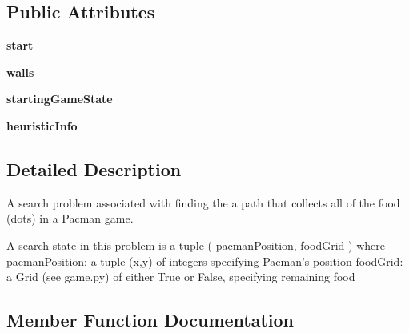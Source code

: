 \subsection*{Public Attributes}
\begin{DoxyCompactItemize}
\item 
\mbox{\label{classsearch_agents_1_1_food_search_problem_a4ef87b14faf538073a2b15cf7c3d425d}} 
{\bfseries start}
\item 
\mbox{\label{classsearch_agents_1_1_food_search_problem_a453ebb7aa98704cf8ccac7dc98157494}} 
{\bfseries walls}
\item 
\mbox{\label{classsearch_agents_1_1_food_search_problem_a53eb097b181626e977c8fe5a337c1a1a}} 
{\bfseries starting\+Game\+State}
\item 
\mbox{\label{classsearch_agents_1_1_food_search_problem_a5ed921e24b8daf256d6738415f1e22c1}} 
{\bfseries heuristic\+Info}
\end{DoxyCompactItemize}


\subsection{Detailed Description}
\begin{DoxyVerb}A search problem associated with finding the a path that collects all of the
food (dots) in a Pacman game.

A search state in this problem is a tuple ( pacmanPosition, foodGrid ) where
  pacmanPosition: a tuple (x,y) of integers specifying Pacman's position
  foodGrid:       a Grid (see game.py) of either True or False, specifying remaining food
\end{DoxyVerb}
 

\subsection{Member Function Documentation}
\mbox{\label{classsearch_agents_1_1_food_search_problem_a77b77a7182bb81a22a67f0b48170da2c}} 
